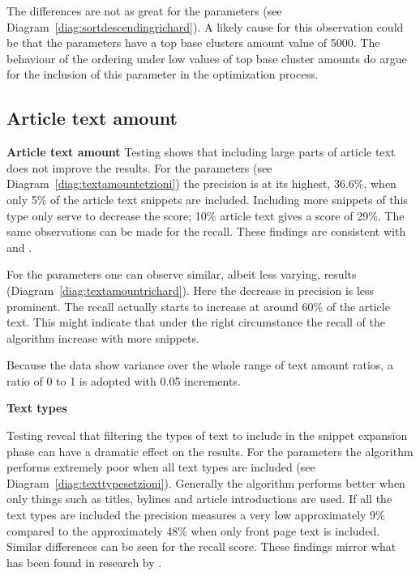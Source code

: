 The differences are not as great for the \citeauthor{Moe2014} parameters (see Diagram~\ref{diag:sortdescendingrichard}). A likely cause for this observation could be that the \citeauthor{Moe2014} parameters have a top base clusters amount value of 5000. The behaviour of the ordering under low values of top base cluster amounts do argue for the inclusion of this parameter in the optimization process.

\subsection{Article text amount}

\textbf{Article text amount}
Testing shows that including large parts of article text does not improve the results. For the \citeauthor{Oren1998} parameters (see Diagram~\ref{diag:textamountetzioni}) the precision is at its highest, 36.6\%, when only 5\% of the article text snippets are included. Including more snippets of this type only serve to decrease the score; 10\% article text gives a score of 29\%. The same observations can be made for the recall. These findings are consistent with \cite{Oren1998} and \cite{Moe2014compact}.

For the \citeauthor{Moe2014compact} parameters one can observe similar, albeit less varying, results (Diagram~\ref{diag:textamountrichard}). Here the decrease in precision is less prominent. The recall actually starts to increase at around 60\% of the article text. This might indicate that under the right circumstance the recall of the algorithm increase with more snippets.

Because the data show variance over the whole range of text amount ratios, a ratio of 0 to 1 is adopted with 0.05 increments.

\textbf{Text types}

Testing reveal that filtering the types of text to include in the snippet expansion phase can have a dramatic effect on the results. For the \citeauthor{Oren1998} parameters the algorithm performs extremely poor when all text types are included (see Diagram~\ref{diag:texttypesetzioni}). Generally the algorithm performs better when only things such as titles, bylines and article introductions are used. If all the text types are included the precision measures a very low approximately  9\% compared to the approximately  48\% when only front page text is included. Similar differences can be seen for the recall score. These findings mirror what has been found in research by \cite{Oren1998}.

